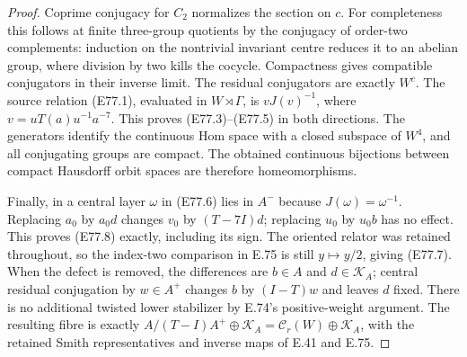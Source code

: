 \begin{proof}
Coprime conjugacy for $C_2$
normalizes the section on $c$.
For completeness this follows
at finite three-group quotients
by the conjugacy of order-two
complements: induction on the
nontrivial invariant centre
reduces it to an abelian group,
where division by two kills
the cocycle. Compactness
gives compatible conjugators
in their inverse limit.
The residual conjugators are
exactly $W^c$.
The source relation (E77.1),
evaluated in $W\rtimes\Gamma$,
is $vJ(v)^{-1}$, where
$v=uT(a)u^{-1}a^{-7}$.
This proves (E77.3)--(E77.5)
in both directions.
The generators identify the
continuous Hom space with a
closed subspace of $W^4$,
and all conjugating groups
are compact. The obtained
continuous bijections between
compact Hausdorff orbit spaces
are therefore homeomorphisms.

Finally, in a central layer
$\omega$ in (E77.6) lies in
$A^-$ because $J(\omega)=
\omega^{-1}$. Replacing
$a_0$ by $a_0d$ changes $v_0$
by $(T-7I)d$; replacing $u_0$
by $u_0b$ has no effect.
This proves (E77.8) exactly,
including its sign.
The oriented relator was
retained throughout, so the
index-two comparison in E.75
is still $y\mapsto y/2$,
giving (E77.7).
When the defect is removed,
the differences are $b\in A$
and $d\in\mathcal K_A$;
central residual conjugation
by $w\in A^+$ changes $b$
by $(I-T)w$ and leaves $d$
fixed. There is no additional
twisted lower stabilizer by
E.74's positive-weight argument.
The resulting fibre is exactly
$A/(T-I)A^+\oplus\mathcal K_A
=\mathcal C_r(W)\oplus\mathcal K_A$,
with the retained Smith
representatives and inverse
maps of E.41 and E.75.
\end{proof}
